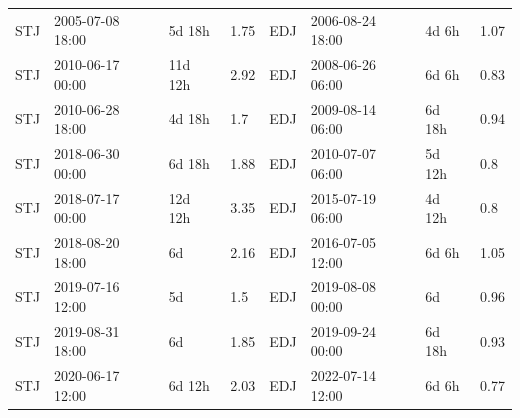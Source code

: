 \begin{tabular}{l}
STJ & 2005-07-08 18:00 & 5d 18h & 1.75 & EDJ & 2006-08-24 18:00 & 4d 6h & 1.07 \\
STJ & 2010-06-17 00:00 & 11d 12h & 2.92 & EDJ & 2008-06-26 06:00 & 6d 6h & 0.83 \\
STJ & 2010-06-28 18:00 & 4d 18h & 1.7 & EDJ & 2009-08-14 06:00 & 6d 18h & 0.94 \\
STJ & 2018-06-30 00:00 & 6d 18h & 1.88 & EDJ & 2010-07-07 06:00 & 5d 12h & 0.8 \\
STJ & 2018-07-17 00:00 & 12d 12h & 3.35 & EDJ & 2015-07-19 06:00 & 4d 12h & 0.8 \\
STJ & 2018-08-20 18:00 & 6d & 2.16 & EDJ & 2016-07-05 12:00 & 6d 6h & 1.05 \\
STJ & 2019-07-16 12:00 & 5d & 1.5 & EDJ & 2019-08-08 00:00 & 6d & 0.96 \\
STJ & 2019-08-31 18:00 & 6d & 1.85 & EDJ & 2019-09-24 00:00 & 6d 18h & 0.93 \\
STJ & 2020-06-17 12:00 & 6d 12h & 2.03 & EDJ & 2022-07-14 12:00 & 6d 6h & 0.77 \\
\bottomrule
\end{tabular}
